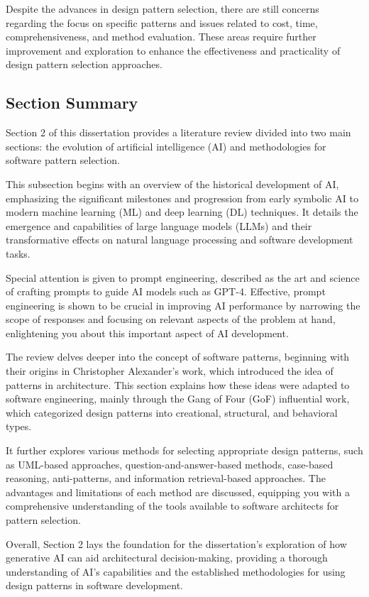 Despite the advances in design pattern selection, there are still concerns regarding the focus on specific patterns and issues related to cost, time, comprehensiveness, and method evaluation. These areas require further improvement and exploration to enhance the effectiveness and practicality of design pattern selection approaches.

\subsection{Section Summary}

Section 2 of this dissertation provides a literature review divided into two main sections: the evolution of artificial intelligence (AI) and methodologies for software pattern selection.


This subsection begins with an overview of the historical development of AI, emphasizing the significant milestones and progression from early symbolic AI to modern machine learning (ML) and deep learning (DL) techniques. It details the emergence and capabilities of large language models (LLMs) and their transformative effects on natural language processing and software development tasks.
    
Special attention is given to prompt engineering, described as the art and science of crafting prompts to guide AI models such as GPT-4. Effective, prompt engineering is shown to be crucial in improving AI performance by narrowing the scope of responses and focusing on relevant aspects of the problem at hand, enlightening you about this important aspect of AI development.



The review delves deeper into the concept of software patterns, beginning with their origins in Christopher Alexander's work, which introduced the idea of patterns in architecture. This section explains how these ideas were adapted to software engineering, mainly through the Gang of Four (GoF) influential work, which categorized design patterns into creational, structural, and behavioral types.

It further explores various methods for selecting appropriate design patterns, such as UML-based approaches, question-and-answer-based methods, case-based reasoning, anti-patterns, and information retrieval-based approaches. The advantages and limitations of each method are discussed, equipping you with a comprehensive understanding of the tools available to software architects for pattern selection.

Overall, Section 2 lays the foundation for the dissertation's exploration of how generative AI can aid architectural decision-making, providing a thorough understanding of AI's capabilities and the established methodologies for using design patterns in software development.
